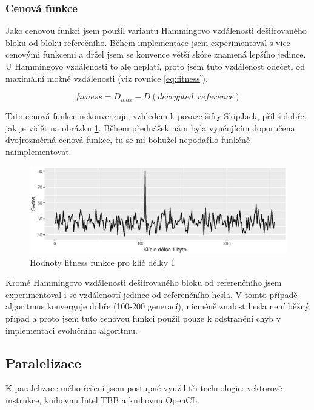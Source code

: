\documentclass[11pt,a4paper]{scrartcl}
\begin{document}
	\subsubsection{Cenová funkce}
	Jako cenovou funkci jsem použil variantu Hammingovo vzdálenosti dešifrovaného bloku od bloku referečního. Během implementace jsem experimentoval s více cenovými funkcemi a držel jsem se konvence větší skóre znamená lepšího jedince. U Hammingovo vzdálenosti to ale neplatí, proto jsem tuto vzdálenost odečetl od maximální možné vzdálenosti (viz rovnice \ref{eq:fitness}).
	
	\begin{equation}
		fitness = D_{max} - D(decrypted,reference)
		\label{eq:fitness}
	\end{equation}
	
	Tato cenová funkce nekonverguje, vzhledem k povaze šifry SkipJack, příliš dobře, jak je vidět na obrázku \ref{fig:fitness-chart}. Během přednášek nám byla vyučujícím doporučena dvojrozměrná cenová funkce, tu se mi bohužel nepodařilo funkčně naimplementovat.
	
	\begin{figure}[!h]
		\centering
		\includegraphics[width=15cm]{img/fitness-plot}
		\caption{Hodnoty fitness funkce pro klíč délky 1}
		\label{fig:fitness-chart}
	\end{figure}

	Kromě Hammingovo vzdálenosti dešifrovaného bloku od referenčního jsem experimentoval i se vzdáleností jedince od referenčního hesla. V tomto případě algoritmus konverguje dobře (100-200 generací), nicméně znalost hesla není běžný případ a proto jsem tuto cenovou funkci použil pouze k odstranění chyb v implementaci evolučního algoritmu.
	
	
	\subsection{Paralelizace}
	K paralelizace mého řešení jsem postupně využil tři technologie: vektorové instrukce, knihovnu Intel TBB a knihovnu OpenCL. 
	
\end{document}
